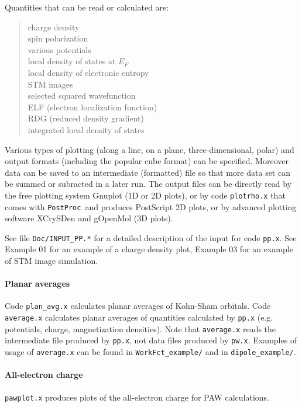 \documentclass[12pt,a4paper]{article}
\def\pwx{\texttt{pw.x}}
\def\PostProc{\texttt{PostProc}}
\begin{document}
Quantities that can be read or calculated are:
\begin{quote}
      charge density\\
      spin polarization\\
      various potentials\\
      local density of states at $E_F$\\
      local density of electronic entropy\\
      STM images\\
      selected squared wavefunction\\
      ELF (electron localization function)\\
      RDG (reduced density gradient)\\
      integrated local density of states
\end{quote}
Various types of plotting (along a line, on a plane, three-dimensional, polar)
and output formats (including the popular cube format) can be specified.
Moreover data can be saved to an intermediate (formatted) file so that
more data set can be summed or subracted in a later run.
The output files can be directly read by the free plotting system Gnuplot
(1D or 2D plots), or by code \texttt{plotrho.x} that comes with \PostProc\ 
and produces PostScript 2D plots,
or by advanced plotting software XCrySDen and gOpenMol (3D plots).

See file \texttt{Doc/INPUT\_PP.*} for a detailed description of the input
for code \texttt{pp.x}.
See Example 01 for an example of a charge density plot, Example 03
for an example of STM image simulation.

\paragraph{Planar averages}
Code \texttt{plan\_avg.x} calculates planar averages of Kohn-Sham orbitals.
Code \texttt{average.x} calculates planar averages of quantities calculated
by \texttt{pp.x} (e.g. potentials, charge, magnetization densities).
Note that \texttt{average.x} reads the intermediate file produced
by \texttt{pp.x}, not data files produced by \pwx. Examples of usage 
of \texttt{average.x} can be found in \texttt{WorkFct\_example/} 
and in \texttt{dipole\_example/}.

\paragraph{All-electron charge}
\texttt{pawplot.x} produces plots of the all-electron charge
for PAW calculations.
\end{document}
